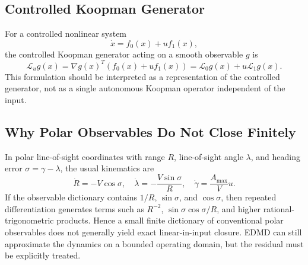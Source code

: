 \documentclass[letterpaper,journal]{IEEEtran}
\begin{document}
\subsection{Controlled Koopman Generator}
For a controlled nonlinear system
\begin{equation}
    \dot x=f_0(x)+u f_1(x),
\end{equation}
the controlled Koopman generator acting on a smooth observable $g$ is
\begin{equation}
    \mathcal L_u g(x)=\nabla g(x)^T(f_0(x)+u f_1(x))
    =\mathcal L_0g(x)+u\mathcal L_1g(x).
\end{equation}
This formulation should be interpreted as a representation of the controlled generator, not as a single autonomous Koopman operator independent of the input.

\subsection{Why Polar Observables Do Not Close Finitely}
In polar line-of-sight coordinates with range $R$, line-of-sight angle $\lambda$, and heading error $\sigma=\gamma-\lambda$, the usual kinematics are
\begin{equation}
    \dot R=-V\cos\sigma,\quad
    \dot\lambda=-\frac{V\sin\sigma}{R},\quad
    \dot\gamma=\frac{A_{\max}}{V}u .
\end{equation}
If the observable dictionary contains $1/R$, $\sin\sigma$, and $\cos\sigma$, then repeated differentiation generates terms such as $R^{-2}$, $\sin\sigma\cos\sigma/R$, and higher rational-trigonometric products. Hence a small finite dictionary of conventional polar observables does not generally yield exact linear-in-input closure. EDMD can still approximate the dynamics on a bounded operating domain, but the residual must be explicitly treated.
\end{document}
